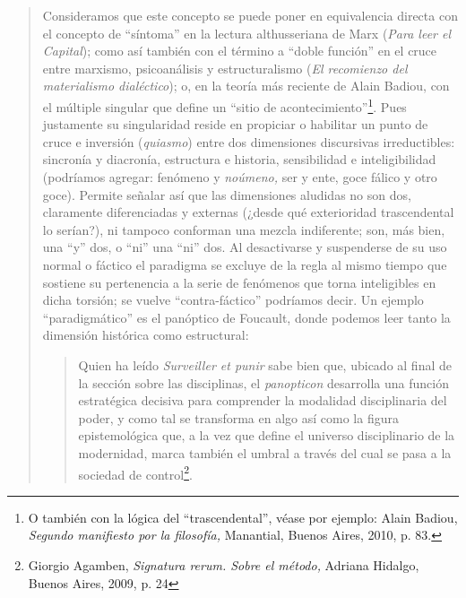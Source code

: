 \begin{quote}
Consideramos que este concepto se puede poner en equivalencia directa con el concepto de \enquote{síntoma} en la lectura althusseriana de Marx (\emph{Para leer el Capital}); como así también con el término a \enquote{doble función} en el cruce entre marxismo, psicoanálisis y estructuralismo (\emph{El recomienzo del materialismo dialéctico}); o, en la teoría más reciente de Alain Badiou, con el múltiple singular que define un \enquote{sitio de acontecimiento}\footnote{O también con la lógica del \enquote{trascendental}, véase por ejemplo: Alain Badiou, \emph{Segundo manifiesto por la filosofía,} Manantial, Buenos Aires, 2010, p. 83.}. Pues justamente su singularidad reside en propiciar o habilitar un punto de cruce e inversión (\emph{quiasmo}) entre dos dimensiones discursivas irreductibles: sincronía y diacronía, estructura e historia, sensibilidad e inteligibilidad (podríamos agregar: fenómeno y \emph{noúmeno,} ser y ente, goce fálico y otro goce). Permite señalar así que las dimensiones aludidas no son dos, claramente diferenciadas y externas (¿desde qué exterioridad trascendental lo serían?), ni tampoco conforman una mezcla indiferente; son, más bien, una \enquote{y} dos, o \enquote{ni} una \enquote{ni} dos. Al desactivarse y suspenderse de su uso normal o fáctico el paradigma se excluye de la regla al mismo tiempo que sostiene su pertenencia a la serie de fenómenos que torna inteligibles en dicha torsión; se vuelve \enquote{contra-fáctico} podríamos decir. Un ejemplo \enquote{paradigmático} es el panóptico de Foucault, donde podemos leer tanto la dimensión histórica como estructural:

\begin{quote}
Quien ha leído \emph{Surveiller et punir} sabe bien que, ubicado al final de la sección sobre las disciplinas, el \emph{panopticon} desarrolla una función estratégica decisiva para comprender la modalidad disciplinaria del poder, y como tal se transforma en algo así como la figura epistemológica que, a la vez que define el universo disciplinario de la modernidad, marca también el umbral a través del cual se pasa a la sociedad de control\footnote{Giorgio Agamben, \emph{Signatura rerum. Sobre el método,} Adriana Hidalgo, Buenos Aires, 2009, p. 24}.
\end{quote}


\end{quote}
